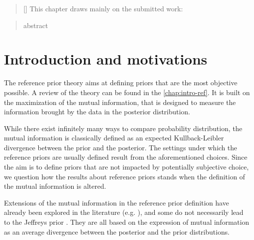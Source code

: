 
\begin{abstract}[\hspace*{-10pt}]
    This chapter draws mainly on the submitted work:   %
\end{abstract}

\begin{abstract}
    abstract
\end{abstract}

\minitoc

\section{Introduction and motivations}

The reference prior theory aims at defining priors that are the most objective possible. A review of the theory can be found in the \cref{chap:intro-ref}. It is built on the maximization of the mutual information, that is designed to measure the information brought by the data in the posterior distribution.

While there exist infinitely many ways to compare probability distribution, the mutual information is classically defined as an expected Kullback-Leibler divergence between the prior and the posterior.
The settings under which the reference priors are usually defined result from the aforementioned choices. Since the aim is to define priors that are not impacted by potentially subjective choice, we question how the results about reference priors stands when the definition of the mutual information is altered.

Extensions of the mutual information in the reference prior definition have already been explored in the literature (e.g. \cite{chen_objective_2010,liu_divergence_2014,le_formal_2014}), and some do not necessarily lead to the Jeffreys prior \citep{hashimoto_reference_2021,clarke_reference_1997,ghosh_general_2011}. They are all based on the expression of mutual information as an average divergence between the posterior and the prior distributions.




